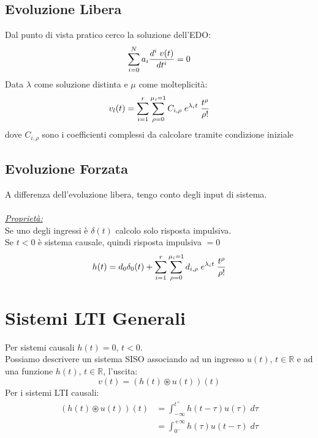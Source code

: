 \documentclass{article}
\begin{document}
		\subsection{Evoluzione Libera}
			Dal punto di vista pratico cerco la soluzione dell'EDO:
			\[
				\sum_{i=0}^{N} {a_i{{d^i\; v(t)}\over{dt^i}}} =0
			\]
			Data $ \lambda $ come soluzione distinta e $ \mu $ come molteplicità:
			\[
				v_l(t) = \sum_{i=1}^{r} {\sum_{\rho=0}^{\mu_i = 1} {C_{i,\rho}\;e^{\lambda_i t}\;{{t^\rho}\over{\rho!}}}}
			\]
			dove $ C_{i,\rho} $ sono i coefficienti complessi da calcolare tramite condizione iniziale

		\subsection{Evoluzione Forzata}
			A differenza dell'evoluzione libera, tengo conto degli input di sistema. \\
			\\
			\underline{\textit{Proprietà:}} \\
			Se uno degli ingressi è $ \delta(t) $ calcolo solo risposta impulsiva.\\
			Se $ t<0 $ è sistema causale, quindi risposta impulsiva $ =0 $
			\[
				h(t)=d_0\delta_0(t) + \sum_{i=1}^{r} {\sum_{\rho=0}^{\mu_i = 1} {d_{i,\rho}\;e^{\lambda_i t}\;{{t^\rho}\over{\rho!}}}}
			\]

	\section{Sistemi LTI Generali}
	    Per sistemi causali $ h(t)=0 $, $ t<0 $. \\
	    Possiamo descrivere un sistema SISO associando ad un ingresso $ u(t) $, $ t \in \mathbb{R} $ e ad una funzione $ h(t) $, $ t \in \mathbb{R} $, l'uscita:
	    \[
	        v(t)=(h(t) \circledast u(t))(t)
	    \]
	    Per i sistemi LTI causali:
	    \[
	        \begin{aligned}
	            (h(t) \circledast u(t))(t) &= \int_{-\infty}^{t^+} {h(t-\tau)u(\tau)\; d\tau} \\
	                                       &=  \int_{0^-}^{+\infty} {h(\tau)u(t-\tau)\; d\tau}
	        \end{aligned}
	    \]
\end{document}
